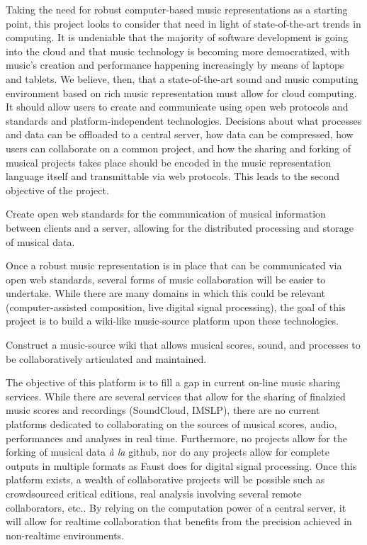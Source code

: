 \documentclass{article}
\begin{document}
Taking the need for robust computer-based music representations as a
starting point, this project looks to consider that need in light of
state-of-the-art trends in computing. It is undeniable that the majority of
software development is going into the cloud and that music technology is
becoming more democratized, with music’s creation and performance happening
increasingly by means of laptops and tablets. We believe, then, that a
state-of-the-art sound and music computing environment based on rich music
representation must allow for cloud computing. It should allow users to
create and communicate using open web protocols and standards and platform-independent
technologies. Decisions about what processes and data can be offloaded to a
central server, how data can be compressed, how users can collaborate on a
common project, and how the sharing and forking of musical projects takes
place should be encoded in the music representation language itself and
transmittable via web protocols. This leads to the second objective of the
project.
\begin{objective}
Create open web standards for the communication of musical
information between clients and a server, allowing for the distributed
processing and storage of musical data.
\end{objective}
Once a robust music representation is in place that can be communicated via
open web standards, several forms of music collaboration will be easier to
undertake. While there are many domains in which this could be relevant
(computer-assisted composition, live digital signal processing), the goal of
this project is to build a wiki-like music-source platform upon
these technologies.  
\begin{objective}
Construct a music-source wiki that allows musical scores, sound, and
processes to be collaboratively articulated and maintained.
\end{objective}
The objective of this platform is to fill a gap in
current on-line music sharing services. While there are several services
that allow for the sharing of finalzied music scores and recordings (SoundCloud,
IMSLP), there are no current platforms dedicated to collaborating on
the sources of musical scores, audio, performances and analyses in real time.
Furthermore,
no projects allow for the forking of musical data \emph{\`a la} github, nor
do any projects allow for complete outputs in multiple formats as Faust does
for digital signal processing.  Once this platform exists, a wealth of
collaborative projects will be possible such as crowdsourced critical
editions, real analysis involving several remote collaborators, etc.. By
relying on the computation power of a central server, it will allow for
realtime collaboration that benefits from the precision achieved in
non-realtime environments.
\end{document}
